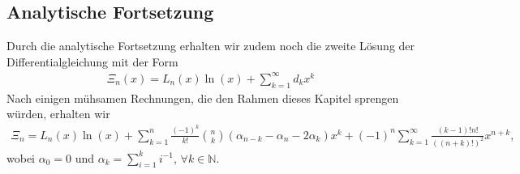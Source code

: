 \subsection{Analytische Fortsetzung}
Durch die analytische Fortsetzung erhalten wir zudem noch die zweite Lösung der
Differentialgleichung mit der Form
\begin{align*}
\Xi_n(x)
=
L_n(x) \ln(x) + \sum_{k=1}^\infty d_k x^k
\end{align*}
Nach einigen mühsamen Rechnungen,
die den Rahmen dieses Kapitel sprengen würden,
erhalten wir
\begin{align*}
\Xi_n
=
L_n(x) \ln(x)
+
\sum_{k=1}^n \frac{(-1)^k}{k!} \binom{n}{k}
(\alpha_{n-k} - \alpha_n - 2 \alpha_k)x^k
+
(-1)^n \sum_{k=1}^\infty \frac{(k-1)!n!}{((n+k)!)^2} x^{n+k},
\end{align*}
wobei $\alpha_0 = 0$ und $\alpha_k =\sum_{i=1}^k i^{-1}$,
$\forall k \in \mathbb{N}$.

